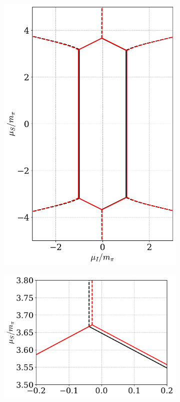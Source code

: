\begin{figure}[!htb]
    \centering
    \begin{subfigure}{0.49\textwidth}
        \includegraphics[width=\textwidth]{../scripts/figurer/phase_diagram_EM.pdf}
    \end{subfigure}
    \begin{subfigure}{0.49\textwidth}
        \includegraphics[width=\textwidth]{../scripts/figurer/phase_diagram_EM3.pdf}

\end{subfigure}
\end{figure}
